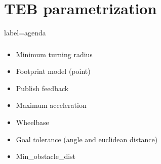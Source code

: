 \documentclass[numberofslides]{AMSBeamer}
\begin{document}
\section{TEB parametrization}
\begin{frame}{label=agenda}
    \frametitle{\insertsectionhead}
    \begin{itemize}
        \item Minimum turning radius
        \item Footprint model (point)
        \item Publish feedback
        \item Maximum acceleration
        \item Wheelbase
        \item Goal tolerance (angle and euclidean distance)
        \item Min\_obstacle\_dist

    \end{itemize}
\end{frame}

\end{document}
